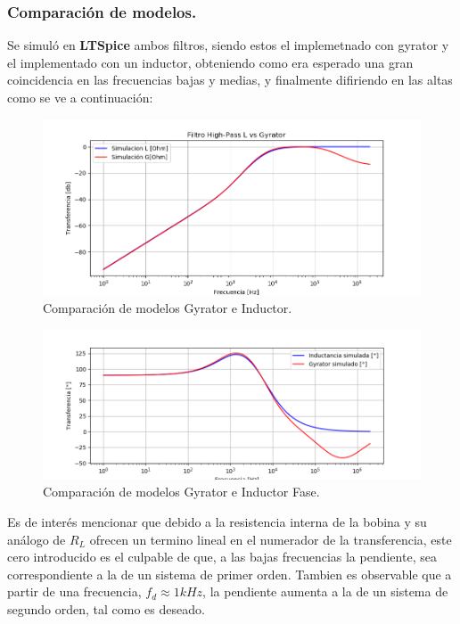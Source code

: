 \subsubsection{Comparación de modelos.}
Se simuló en \textbf{LTSpice} ambos filtros, siendo estos el implemetnado con gyrator y el implementado con un inductor, obteniendo como era esperado una gran coincidencia en las frecuencias bajas y medias, y finalmente difiriendo en las altas como se ve a continuación:
\begin{figure}[H]	
	\centering
	\includegraphics[width=\textwidth]{ImagenesEj2/simHP.PNG}
	\caption{Comparación de modelos Gyrator e Inductor.}
	\label{fig:gyrInd}
\end{figure}
\begin{figure}[H]	
	\centering
	\includegraphics[width=\textwidth]{ImagenesEj2/simHPP.PNG}
	\caption{Comparación de modelos Gyrator e Inductor Fase.}
	\label{fig:gyrIndP}
\end{figure}
Es de interés mencionar que debido a la resistencia interna de la bobina y su análogo de $R_L$ ofrecen un termino lineal en el numerador de la transferencia, este cero introducido es el culpable de que, a las bajas frecuencias la pendiente, sea correspondiente a la de un sistema de primer orden. Tambien es observable que a partir de una frecuencia, $f_d \approx 1kHz $, la pendiente aumenta a la de un sistema de segundo orden, tal como es deseado.
